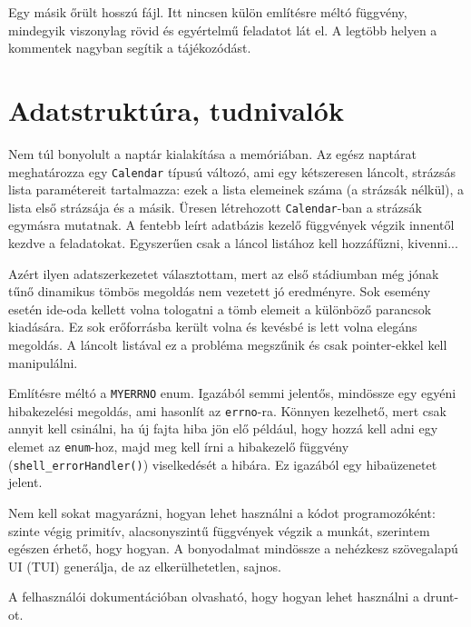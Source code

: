 \documentclass[a4paper]{article}
\begin{document}
Egy másik őrült hosszú fájl. Itt nincsen külön említésre méltó függvény, mindegyik viszonylag rövid és egyértelmű feladatot lát el. A legtöbb helyen a kommentek nagyban segítik a tájékozódást.

\pagebreak

\section{Adatstruktúra, tudnivalók}

Nem túl bonyolult a naptár kialakítása a memóriában. Az egész naptárat meghatározza egy \texttt{Calendar} típusú változó, ami egy kétszeresen láncolt, strázsás lista paramétereit tartalmazza: ezek a lista elemeinek száma (a strázsák nélkül), a lista első strázsája és a másik. Üresen létrehozott \texttt{Calendar}-ban a strázsák egymásra mutatnak. A fentebb leírt adatbázis kezelő függvények végzik innentől kezdve a feladatokat. Egyszerűen csak a láncol listához kell hozzáfűzni, kivenni...

Azért ilyen adatszerkezetet választottam, mert az első stádiumban még jónak tűnő dinamikus tömbös megoldás nem vezetett jó eredményre. Sok esemény esetén ide-oda kellett volna tologatni a tömb elemeit a különböző parancsok kiadására. Ez sok erőforrásba került volna és kevésbé is lett volna elegáns megoldás. A láncolt listával ez a probléma megszűnik és csak pointer-ekkel kell manipulálni.

Említésre méltó a \texttt{MYERRNO} enum. Igazából semmi jelentős, mindössze egy egyéni hibakezelési megoldás, ami hasonlít az \texttt{errno}-ra. Könnyen kezelhető, mert csak annyit kell csinálni, ha új fajta hiba jön elő például, hogy hozzá kell adni egy elemet az \texttt{enum}-hoz, majd meg kell írni a hibakezelő függvény (\texttt{shell\_errorHandler()}) viselkedését a hibára. Ez igazából egy hibaüzenetet jelent.

Nem kell sokat magyarázni, hogyan lehet használni a kódot programozóként: szinte végig primitív, alacsonyszintű függvények végzik a munkát, szerintem egészen érhető, hogy hogyan. A bonyodalmat mindössze a nehézkesz szövegalapú UI (TUI) generálja, de az elkerülhetetlen, sajnos.

A felhasználói dokumentációban olvasható, hogy hogyan lehet használni a drunt-ot. 

	
\end{document}
